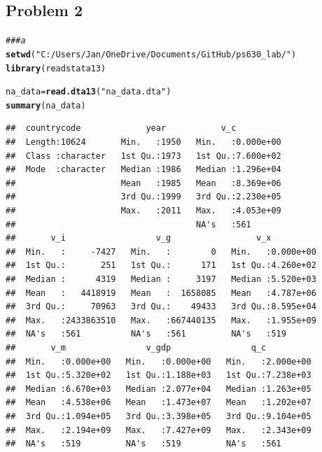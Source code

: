 \documentclass[12pt]{article}\usepackage[]{graphicx}\usepackage[]{color}
\makeatletter
\newcommand{\hlstr}[1]{\textcolor[rgb]{0.192,0.494,0.8}{#1}}%
\newcommand{\hlcom}[1]{\textcolor[rgb]{0.678,0.584,0.686}{\textit{#1}}}%
\newcommand{\hlstd}[1]{\textcolor[rgb]{0.345,0.345,0.345}{#1}}%
\newcommand{\hlkwb}[1]{\textcolor[rgb]{0.69,0.353,0.396}{#1}}%
\newcommand{\hlkwd}[1]{\textcolor[rgb]{0.737,0.353,0.396}{\textbf{#1}}}%
\newenvironment{kframe}{%
 \def\at@end@of@kframe{}%
 \ifinner\ifhmode%
  \def\at@end@of@kframe{\end{minipage}}%
  \begin{minipage}{\columnwidth}%
 \fi\fi%
 \def\FrameCommand##1{\hskip\@totalleftmargin \hskip-\fboxsep
 \colorbox{shadecolor}{##1}\hskip-\fboxsep
     \hskip-\linewidth \hskip-\@totalleftmargin \hskip\columnwidth}%
 \MakeFramed {\advance\hsize-\width
   \@totalleftmargin\z@ \linewidth\hsize
   \@setminipage}}%
 {\par\unskip\endMakeFramed%
 \at@end@of@kframe}
\newenvironment{knitrout}{}{} %
\makeatother
\begin{document}
\pagebreak

\subsection*{Problem 2}

\begin{knitrout}
\color{fgcolor}\begin{kframe}
\begin{alltt}
\hlcom{### a}
\hlkwd{setwd}\hlstd{(}\hlstr{"C:/Users/Jan/OneDrive/Documents/GitHub/ps630_lab/"}\hlstd{)}
\hlkwd{library}\hlstd{(readstata13)}
\end{alltt}


{\ttfamily\noindent\color{warningcolor}{\#\# Warning: package 'readstata13' was built under R version 3.2.2}}\begin{alltt}
\hlstd{na_data} \hlkwb{=} \hlkwd{read.dta13}\hlstd{(}\hlstr{"na_data.dta"}\hlstd{)}
\hlkwd{summary}\hlstd{(na_data)}
\end{alltt}
\begin{verbatim}
##  countrycode             year           v_c           
##  Length:10624       Min.   :1950   Min.   :0.000e+00  
##  Class :character   1st Qu.:1973   1st Qu.:7.600e+02  
##  Mode  :character   Median :1986   Median :1.296e+04  
##                     Mean   :1985   Mean   :8.369e+06  
##                     3rd Qu.:1999   3rd Qu.:2.230e+05  
##                     Max.   :2011   Max.   :4.053e+09  
##                                    NA's   :561        
##       v_i                  v_g                 v_x           
##  Min.   :     -7427   Min.   :        0   Min.   :0.000e+00  
##  1st Qu.:       251   1st Qu.:      171   1st Qu.:4.260e+02  
##  Median :      4319   Median :     3197   Median :5.520e+03  
##  Mean   :   4418919   Mean   :  1658085   Mean   :4.787e+06  
##  3rd Qu.:     70963   3rd Qu.:    49433   3rd Qu.:8.595e+04  
##  Max.   :2433863510   Max.   :667440135   Max.   :1.955e+09  
##  NA's   :561          NA's   :561         NA's   :519        
##       v_m                v_gdp                q_c           
##  Min.   :0.000e+00   Min.   :0.000e+00   Min.   :2.000e+00  
##  1st Qu.:5.320e+02   1st Qu.:1.188e+03   1st Qu.:7.238e+03  
##  Median :6.670e+03   Median :2.077e+04   Median :1.263e+05  
##  Mean   :4.538e+06   Mean   :1.473e+07   Mean   :1.202e+07  
##  3rd Qu.:1.094e+05   3rd Qu.:3.398e+05   3rd Qu.:9.104e+05  
##  Max.   :2.194e+09   Max.   :7.427e+09   Max.   :2.343e+09  
##  NA's   :519         NA's   :519         NA's   :561        

\end{verbatim}
\end{kframe}
\end{knitrout}
\end{document}
